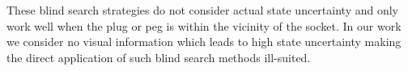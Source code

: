 \documentclass[final,3p,times,twocolumn]{elsarticle}
\begin{document}


These blind search strategies \cite{search_strategies_icra_2001} do not consider actual state uncertainty and only work well when the plug or 
peg is within the vicinity of the socket. In our work we consider no visual information which leads to 
high state uncertainty making the direct application of such blind search methods ill-suited.


\end{document}

